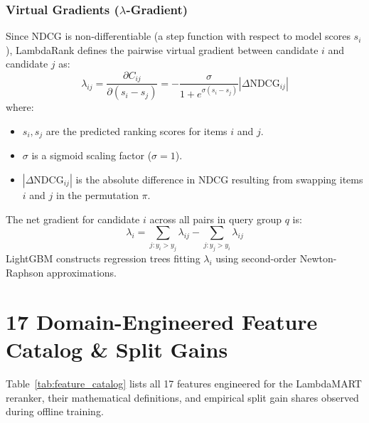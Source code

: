 \documentclass[11pt,a4paper]{article}
\begin{document}
\subsubsection{Virtual Gradients ($\lambda$-Gradient)}
Since NDCG is non-differentiable (a step function with respect to model scores $s_i$), LambdaRank defines the pairwise virtual gradient between candidate $i$ and candidate $j$ as:
\begin{equation}
\lambda_{ij} = \frac{\partial C_{ij}}{\partial (s_i - s_j)} = -\frac{\sigma}{1 + e^{\sigma(s_i - s_j)}} |\Delta \text{NDCG}_{ij}|
\end{equation}
where:
\begin{itemize}
    \item $s_i, s_j$ are the predicted ranking scores for items $i$ and $j$.
    \item $\sigma$ is a sigmoid scaling factor ($\sigma = 1$).
    \item $|\Delta \text{NDCG}_{ij}|$ is the absolute difference in NDCG resulting from swapping items $i$ and $j$ in the permutation $\pi$.
\end{itemize}
The net gradient for candidate $i$ across all pairs in query group $q$ is:
\begin{equation}
\lambda_i = \sum_{j: y_i > y_j} \lambda_{ij} - \sum_{j: y_j > y_i} \lambda_{ij}
\end{equation}
LightGBM constructs regression trees fitting $\lambda_i$ using second-order Newton-Raphson approximations.

\section{17 Domain-Engineered Feature Catalog \& Split Gains}

Table~\ref{tab:feature_catalog} lists all 17 features engineered for the LambdaMART reranker, their mathematical definitions, and empirical split gain shares observed during offline training.
\end{document}
